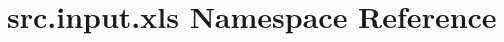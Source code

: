 \hypertarget{namespacesrc_1_1input_1_1xls}{\section{src.\+input.\+xls Namespace Reference}
\label{namespacesrc_1_1input_1_1xls}
}
